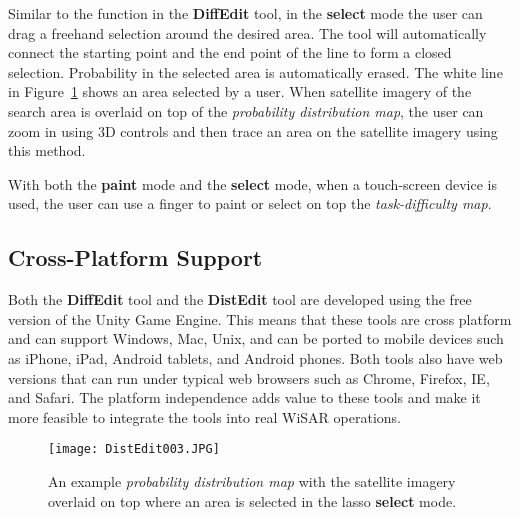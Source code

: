 Similar to the function in the \textbf{DiffEdit} tool, in the \textbf{select} mode the user can drag a freehand selection around the desired area. The tool will automatically connect the starting point and the end point of the line to form a closed selection. Probability in the selected area is automatically erased. The white line in Figure~\ref{DistEdit003} shows an area selected by a user. When satellite imagery of the search area is overlaid on top of the \textit{probability distribution map}, the user can zoom in using 3D controls and then trace an area on the satellite imagery using this method.

With both the \textbf{paint} mode and the \textbf{select} mode, when a touch-screen device is used, the user can use a finger to paint or select on top the \textit{task-difficulty map}.

\subsection{Cross-Platform Support}

Both the \textbf{DiffEdit} tool and the \textbf{DistEdit} tool are developed using the free version of the Unity Game Engine. This means that these tools are cross platform and can support Windows, Mac, Unix, and can be ported to mobile devices such as iPhone, iPad, Android tablets, and Android phones. Both tools also have web versions that can run under typical web browsers such as Chrome, Firefox, IE, and Safari. The platform independence adds value to these tools and make it more feasible to integrate the tools into real WiSAR operations.

\begin{figure}
\centering
\texttt{[image: DistEdit003.JPG]}
\caption{An example \textit{probability distribution map} with the satellite imagery overlaid on top where an area is selected in the lasso \textbf{select} mode.}
\label{DistEdit003}
\end{figure}
